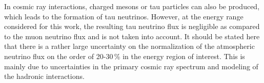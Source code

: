 In cosmic ray interactions, charged mesons or tau particles can also be produced, which leads to the formation of tau neutrinos.
However, at the energy range considered for this work, the resulting tau neutrino flux is negligible as compared to the muon neutrino flux  and is not taken into account.
It should be stated here that there is a rather large uncertainty on the normalization of the atmospheric neutrino flux on the order of 20-30\,\%  in the energy region of interest.
This is mainly due to uncertainties in the primary cosmic ray spectrum and modeling of the hadronic interactions.




